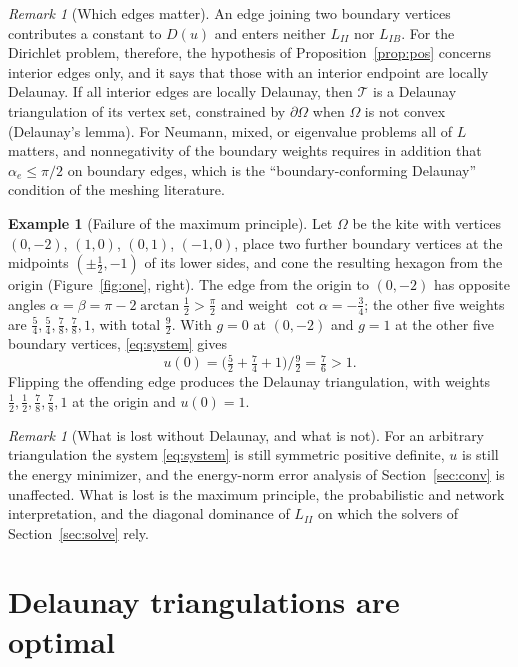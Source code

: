 \documentclass[11pt]{amsart}
\theoremstyle{definition}
\newtheorem{example}[theorem]{Example}
\theoremstyle{remark}
\newtheorem{remark}[theorem]{Remark}
\newcommand{\cT}{\mathcal{T}}
\begin{document}
\begin{remark}[Which edges matter]\label{rem:which}
An edge joining two boundary vertices contributes a constant to $D(u)$ and enters neither $L_{II}$ nor $L_{IB}$. For the Dirichlet
problem, therefore, the hypothesis of Proposition~\ref{prop:pos} concerns interior edges only, and it says that those with an interior endpoint are
locally Delaunay. If all interior edges are locally Delaunay, then $\cT$ is a Delaunay triangulation of its vertex set, constrained by $\partial\Omega$ when
$\Omega$ is not convex (Delaunay's lemma). For Neumann, mixed, or eigenvalue problems all of $L$ matters, and nonnegativity of the boundary weights
requires in addition that $\alpha_e\le\pi/2$ on boundary edges, which is the ``boundary-conforming Delaunay'' condition of the meshing literature.
\end{remark}

\begin{example}[Failure of the maximum principle]\label{ex:hex}
Let $\Omega$ be the kite with vertices $(0,-2)$, $(1,0)$, $(0,1)$, $(-1,0)$, place two further boundary vertices at the midpoints $(\pm\frac12,-1)$ of its lower sides, and cone
the resulting hexagon from the origin (Figure~\ref{fig:one}, right). The
edge from the origin to $(0,-2)$ has opposite angles $\alpha=\beta=\pi-2\arctan\frac12>\frac\pi2$ and weight $\cot\alpha=-\frac34$; the other five weights are
$\frac54,\frac54,\frac78,\frac78,1$, with total $\frac92$. With $g=0$ at $(0,-2)$ and $g=1$ at the other five boundary vertices, \eqref{eq:system} gives
\[
u(0)=\bigl(\tfrac52+\tfrac74+1\bigr)\big/\tfrac92=\tfrac76>1 .
\]
Flipping the offending edge produces the Delaunay triangulation, with weights $\frac12,\frac12,\frac78,\frac78,1$ at the origin and $u(0)=1$.
\end{example}

\begin{remark}[What is lost without Delaunay, and what is not]\label{rem:lost}
For an arbitrary triangulation the system \eqref{eq:system} is still symmetric positive definite, $u$ is still the energy minimizer, and
the energy-norm error analysis of Section~\ref{sec:conv} is unaffected. What is lost is the maximum principle, the probabilistic and network
interpretation, and the diagonal dominance of $L_{II}$ on which the solvers of Section~\ref{sec:solve} rely.
\end{remark}

\section{Delaunay triangulations are optimal}\label{sec:rippa}
\end{document}
